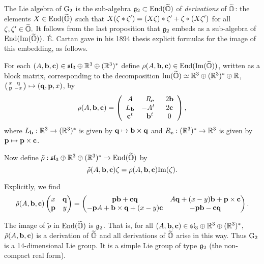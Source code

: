  
 
 
 

 


  
  
  The Lie algebra of ${\rm G}_2$ is the  sub-algebra  ${\mathfrak{g}}_2\subset{\rm End}(\widetilde{\mathbb O})$ of {\em derivations} of $\widetilde{\mathbb O}$: the elements  $X\in {\rm End}(\widetilde{\mathbb O})$ such that $ X (\zeta\ast\zeta')= (X \zeta)\ast\zeta'+\zeta\ast (X \zeta')$ for all $\zeta, \zeta'\in \widetilde{\mathbb O}.$ It follows from the last proposition that ${\mathfrak{g}}_2$ embeds as a sub-algebra of ${\rm End}({\rm Im}(\widetilde{\mathbb O}))$.  \'E.  Cartan gave in his  1894 thesis  explicit  formulas for the image of this embedding, as follows.




For  each  $(A,{\bf b}, {\bf c})\in \mathfrak{sl}_3\oplus \mathbb{R}^3\oplus(\mathbb{R}^3)^*$   define  $\rho(A,{\bf b},{\bf c})\in{\rm End}({\rm Im}(\widetilde{\mathbb O}))$, written  as a block matrix, corresponding to the decomposition  ${\rm Im}(\widetilde{\mathbb O})\simeq\mathbb{R}^3\oplus(\mathbb{R}^3)^*\oplus\mathbb{R}$, 
$\left(\begin{smallmatrix}x&\mathbf q \\ {\mathbf p}&-x\end{smallmatrix}\right)\mapsto (\mathbf q,{\mathbf p},x)$, 
by 
$$\rho(A,{\bf b},{\bf c})=
    \left(
        \begin{array}{ccc}
           A& R_{\bf c} &2{\bf b}\\
           L_{\bf b} &-A^t\,\,\,&2{\bf c}\\
           {\bf c}^t &{\bf b}^t& 0 
        \end{array}
    \right),$$
where   $L_{\bf b}:\mathbb{R}^3\to(\mathbb{R}^3)^*$ is given by $\mathbf q\mapsto {\bf b}\times \mathbf q$ and  $R_{\bf c}:(\mathbb{R}^3)^* \to\mathbb{R}^3$ is given by ${\mathbf p}\mapsto{\mathbf p}\times {\bf c}$. 




Now define $\tilde\rho: \mathfrak{sl}_3\oplus \mathbb{R}^3\oplus(\mathbb{R}^3)^*\to {\rm End}(\widetilde{\mathbb O})$ by $$\tilde\rho(A,{\bf b}, {\bf c})\zeta=\rho(A,{\bf b}, {\bf c}){\rm Im}(\zeta).$$

Explicitly, we find
$$\tilde\rho(A,{\bf b}, {\bf c}) \left(\begin{matrix}x&\mathbf q \\ {\mathbf p}&y\end{matrix}\right)=
\left(\begin{matrix}{\mathbf p}{\bf b}+{\bf c}\mathbf q&A\mathbf q +(x-y){\bf b}+{\mathbf p}\times{\bf c}\\ -{\mathbf p} A+{\bf b}\times\mathbf q+(x-y){\bf c}&-{\mathbf p}{\bf b}-{\bf c}\mathbf q\end{matrix}\right)
.$$


\begin{proposition} The image of $\tilde\rho$ in ${\rm End}(\widetilde{\mathbb O})$ is  ${\mathfrak{g}}_2$.  That is, for all $(A,{\bf b},{\bf c})\in\mathfrak{sl}_3\oplus  \mathbb{R}^3\oplus(\mathbb{R}^3)^*$,  $\tilde\rho(A,{\bf b},{\bf c})$ is a derivation of $\widetilde{\mathbb O}$  and all derivations of $\widetilde{\mathbb O}$ arise in this way. Thus  ${\rm G}_2$ is a 14-dimensional Lie group. It is a simple Lie group  of type ${\mathfrak{g}}_2$ (the non-compact real form). 


\end{proposition}

